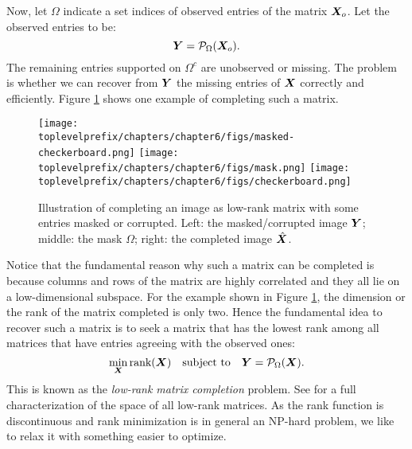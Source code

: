 \documentclass[../../book-main.tex]{subfiles}
\begin{document}
Now, let $\Omega$ indicate a set indices of observed entries of the matrix $\bm{X}_o$. Let the observed entries to be:
\begin{equation}
\bm{Y} = \mathcal{P}_{\Omega}(\bm{X}_o).
\end{equation}
The remaining entries supported on $\Omega^c$ are unobserved or
missing. The problem is whether we can recover from $\bm{Y}$ the missing
entries of $\bm{X}$ correctly and efficiently.  Figure \ref{fig:matrix-completion} shows one
example of completing such a matrix.

\begin{figure}
\centering
\texttt{[image: \\toplevelprefix/chapters/chapter6/figs/masked-checkerboard.png]}\;\;
\texttt{[image: \\toplevelprefix/chapters/chapter6/figs/mask.png]}\;\;
\texttt{[image: \\toplevelprefix/chapters/chapter6/figs/checkerboard.png]}
\caption{Illustration of  completing an image as low-rank matrix
  with some entries masked or corrupted. Left: the masked/corrupted
image $\bm{Y}$; middle: the mask $\Omega$; right: the completed image $\hat {\bm{X}}$.}
\label{fig:matrix-completion}
\end{figure}

Notice that the fundamental reason why such a matrix can be completed is because columns and rows of the matrix are highly correlated and
they all lie on a low-dimensional subspace. For the example shown in
Figure \ref{fig:matrix-completion}, the dimension or the rank of the matrix completed is only two. Hence the fundamental idea to recover such a matrix is to seek a matrix that has the lowest rank among all
matrices that have entries agreeing with the observed ones:
\begin{equation}
\min_{\bm{X}} \mbox{rank}(\bm{X}) \quad \mbox{subject to}
\quad
\bm{Y} = \mathcal{P}_{\Omega}(\bm{X}).
\label{eqn:rank-min}
\end{equation}
This is known as the {\em low-rank matrix completion} problem. See \cite{Wright-Ma-2022} for a full characterization of the space of all low-rank matrices. As the rank function is discontinuous and rank minimization
is in general an NP-hard problem, we like to relax it with
something easier to optimize.
\end{document}
